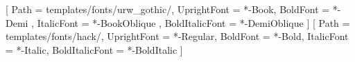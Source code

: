 
\usepackage[verbose]{newunicodechar}


\newfontfamily{}
\DeclareTextFontCommand{\symb}{\sym}


\newunicodechar{ }{\symb  }




\usepackage{fvextra}


\usepackage{fontspec} 
\setmainfont{URWGothic}[
	Path = templates/fonts/urw_gothic/,
	UprightFont = *-Book,
	BoldFont = *-Demi ,
	ItalicFont = *-BookOblique ,
	BoldItalicFont = *-DemiOblique
]
\setmonofont{Hack}[
	Path = templates/fonts/hack/,
	UprightFont = *-Regular,
	BoldFont = *-Bold,
	ItalicFont = *-Italic,
	BoldItalicFont = *-BoldItalic
]
